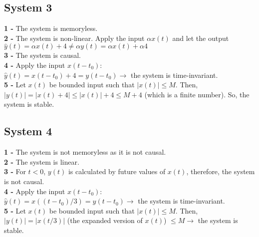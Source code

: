 \documentclass[12pt]{article}
\begin{document}
    \subsection*{System 3}
    \textbf{1 - }The system is memoryless. \\
    \textbf{2 - }The system is non-linear. Apply the input \(\alpha x(t)\) and let the output \(\hat{y}(t)=\alpha x(t) + 4 \neq \alpha y(t) = \alpha x(t) + \alpha 4\)\\
    \textbf{3 - }The system is causal. \\
    \textbf{4 - }Apply the input \(x(t-t_0)\):\\
    \(\hat{y}(t) = x(t-t_0) + 4 = y(t-t_0) \longrightarrow\) the system is time-invariant. \\
    \textbf{5 - }Let \(x(t)\) be bounded input such that \(\left\lvert x(t)\right\rvert \leq M\). Then, 
    \(\left\lvert y(t)\right\rvert = \left\lvert x(t) + 4\right\rvert \leq \left\lvert x(t)\right\rvert + 4 \leq M+4\) (which is a finite number). So, the system
    is stable. \\
    \subsection*{System 4}
    \textbf{1 - }The system is not memoryless as it is not causal. \\
    \textbf{2 - }The system is linear.\\
    \textbf{3 - }For \(t < 0\), \(y(t)\) is calculated by future values of \(x(t)\), therefore, the 
    system is not causal.\\
    \textbf{4 - }Apply the input \(x(t-t_0)\):\\
    \(\hat{y}(t) = x((t-t_0) / 3) = y(t-t_0) \longrightarrow \) the system is time-invariant.\\
    \textbf{5 - }Let \(x(t)\) be bounded input such that \(\left\lvert x(t)\right\rvert \leq M\). Then, \(\left\lvert y(t)\right\rvert = \left\lvert x(t/3)\right\rvert \) (the expanded version of \(x(t)\)) \(\leq M \longrightarrow\) the system is stable.\\
\end{document}
